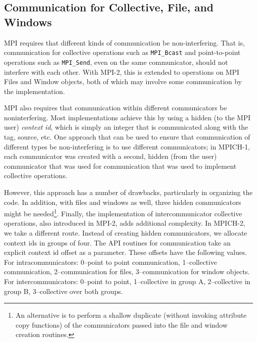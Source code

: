 \documentclass{article}
\def\code#1{\texttt{#1}}
\begin{document}
\subsection{Communication for Collective, File, and Windows}
\label{sec:comm-for-coll}
MPI requires that different kinds of communication be
non-interfering.  That is, communication for collective operations
such as \code{MPI_Bcast} and point-to-point operations such as
\code{MPI_Send}, even on the same communicator, should not interfere
with each other.  With MPI-2, this is extended to operations on MPI
Files and Window objects, both of which may involve some communication
by the implementation.

MPI also requires that communication within different
communicators be noninterfering.  Most implementations achieve this by
using a hidden (to the MPI user) \emph{context id}, which is simply an
integer that is communicated along with the tag, source, etc.  
One approach that can be used to ensure that
communication of different types be non-interfering is to use
different communicators; in MPICH-1, each communicator was created
with a second, hidden (from the user) communicator that was used for
communication that was used to implement collective operations.  

However, this approach has a number of drawbacks, particularly in
organizing the code.  In addition, with files and windows as well,
three hidden communicators might be needed\footnote{An alternative is
to perform a shallow duplicate (without invoking attribute copy
functions) of the communicators passed into the file and window
creation routines.}.  Finally, the implementation of intercommunicator
collective operations, also introduced in MPI-2, adds additional
complexity.  In MPICH-2, we take a different route.  Instead of
creating hidden communicators, we allocate context ids in groups of
four.  The API routines for communication take an explicit context id
offset as a parameter.  These offsets have the following values.  For
intracommunicators: 0--point to point communication, 1--collective
communication, 2--communication for files, 3--communication for window
objects.  For intercommunicators: 0--point to point, 1--collective in
group A, 2--collective in group B, 3--collective over both groups.
%
\end{document}

